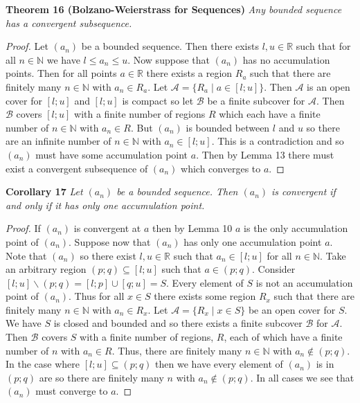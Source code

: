 \documentclass{article}
\begin{document}
\begin{flushleft}
\textbf{Theorem 16 (Bolzano-Weierstrass for Sequences)}
\textsl{Any bounded sequence has a convergent subsequence.}
\begin{proof}
Let $(a_n)$ be a bounded sequence. Then there exists $l,u \in \mathbb{R}$ such that for all $n \in \mathbb{N}$ we have $l \leq a_n \leq u$. Now suppose that $(a_n)$ has no accumulation points. Then for all points $a \in \mathbb{R}$ there exists a region $R_a$ such that there are finitely many $n \in \mathbb{N}$ with $a_n \in R_a$. Let $\mathcal{A} = \{R_a \mid a \in [l;u]\}$. Then $\mathcal{A}$ is an open cover for $[l;u]$ and $[l;u]$ is compact so let $\mathcal{B}$ be a finite subcover for $\mathcal{A}$. Then $\mathcal{B}$ covers $[l;u]$ with a finite number of regions $R$ which each have a finite number of $n \in \mathbb{N}$ with $a_n \in R$. But $(a_n)$ is bounded between $l$ and $u$ so there are an infinite number of $n \in \mathbb{N}$ with $a_n \in [l;u]$. This is a contradiction and so $(a_n)$ must have some accumulation point $a$. Then by Lemma 13 there must exist a convergent subsequence of $(a_n)$ which converges to $a$.
\end{proof}

\textbf{Corollary 17}
\textsl{Let $(a_n)$ be a bounded sequence. Then $(a_n)$ is convergent if and only if it has only one accumulation point.}
\begin{proof}
If $(a_n)$ is convergent at $a$ then by Lemma 10 $a$ is the only accumulation point of $(a_n)$. Suppose now that $(a_n)$ has only one accumulation point $a$. Note that $(a_n)$ so there exist $l,u \in \mathbb{R}$ such that $a_n \in [l;u]$ for all $n \in \mathbb{N}$. Take an arbitrary region $(p;q) \subseteq [l;u]$ such that $a \in (p;q)$. Consider $[l;u] \backslash (p;q) = [l;p] \cup [q;u] = S$. Every element of $S$ is not an accumulation point of $(a_n)$. Thus for all $x \in S$ there exists some region $R_x$ such that there are finitely many $n \in \mathbb{N}$ with $a_n \in R_x$. Let $\mathcal{A} = \{R_x \mid x \in S\}$ be an open cover for $S$. We have $S$ is closed and bounded and so there exists a finite subcover $\mathcal{B}$ for $\mathcal{A}$. Then $\mathcal{B}$ covers $S$ with a finite number of regions, $R$, each of which have a finite number of $n$ with $a_n \in R$. Thus, there are finitely many $n \in \mathbb{N}$ with $a_n \notin (p;q)$. In the case where $[l;u] \subseteq (p;q)$ then we have every element of $(a_n)$ is in $(p;q)$ are so there are finitely many $n$ with $a_n \notin (p;q)$. In all cases we see that $(a_n)$ must converge to $a$.
\end{proof}


\end{flushleft}
\end{document}
